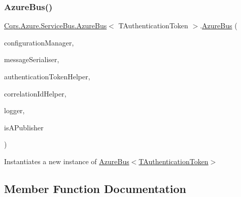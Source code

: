 \subsubsection{\texorpdfstring{Azure\+Bus()}{AzureBus()}}
{\footnotesize\ttfamily \hyperlink{classCqrs_1_1Azure_1_1ServiceBus_1_1AzureBus}{Cqrs.\+Azure.\+Service\+Bus.\+Azure\+Bus}$<$ T\+Authentication\+Token $>$.\hyperlink{classCqrs_1_1Azure_1_1ServiceBus_1_1AzureBus}{Azure\+Bus} (\begin{DoxyParamCaption}\item[{\hyperlink{interfaceCqrs_1_1Configuration_1_1IConfigurationManager}{I\+Configuration\+Manager}}]{configuration\+Manager,  }\item[{\hyperlink{interfaceCqrs_1_1Azure_1_1ServiceBus_1_1IMessageSerialiser}{I\+Message\+Serialiser}$<$ T\+Authentication\+Token $>$}]{message\+Serialiser,  }\item[{\hyperlink{interfaceCqrs_1_1Authentication_1_1IAuthenticationTokenHelper}{I\+Authentication\+Token\+Helper}$<$ T\+Authentication\+Token $>$}]{authentication\+Token\+Helper,  }\item[{I\+Correlation\+Id\+Helper}]{correlation\+Id\+Helper,  }\item[{I\+Logger}]{logger,  }\item[{bool}]{is\+A\+Publisher }\end{DoxyParamCaption})\hspace{0.3cm}{\ttfamily [protected]}}



Instantiates a new instance of \hyperlink{classCqrs_1_1Azure_1_1ServiceBus_1_1AzureBus_a1046ff74282fd178f43e28420433d2a9_a1046ff74282fd178f43e28420433d2a9}{Azure\+Bus$<$\+T\+Authentication\+Token$>$} 



\subsection{Member Function Documentation}
\mbox{\label{classCqrs_1_1Azure_1_1ServiceBus_1_1AzureBus_aad25a164e9e526c59d8ef98635c98095_aad25a164e9e526c59d8ef98635c98095}} 
